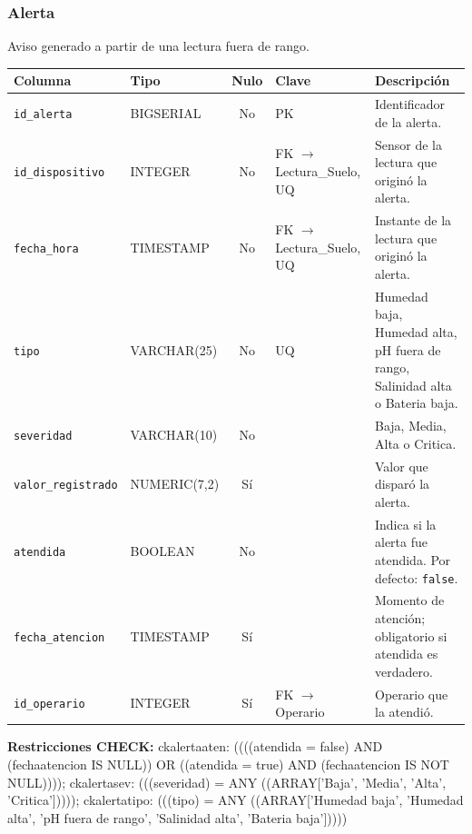 \documentclass[11pt,letterpaper]{article}
\newcommand{\tbus}{\textunderscore\allowbreak}
\newcommand{\tb}[1]{{\ttfamily\let\_\tbus #1}}
\begin{document}
\subsubsection*{Alerta}
Aviso generado a partir de una lectura fuera de rango.
{\footnotesize
\begin{longtable}{>{\raggedright\arraybackslash}p{3.3cm}>{\raggedright\arraybackslash}p{2.5cm}c>{\raggedright\arraybackslash}p{2.2cm}>{\raggedright\arraybackslash}p{6.1cm}}
\toprule
\textbf{Columna} & \textbf{Tipo} & \textbf{Nulo} & \textbf{Clave} & \textbf{Descripción} \\
\midrule
\endhead
\texttt{id\_alerta} & BIGSERIAL & No & PK & Identificador de la alerta. \\
\texttt{id\_dispositivo} & INTEGER & No & FK $\to$ Lectura\_Suelo, UQ & Sensor de la lectura que originó la alerta. \\
\texttt{fecha\_hora} & TIMESTAMP & No & FK $\to$ Lectura\_Suelo, UQ & Instante de la lectura que originó la alerta. \\
\texttt{tipo} & VARCHAR(25) & No & UQ & Humedad baja, Humedad alta, pH fuera de rango, Salinidad alta o Bateria baja. \\
\texttt{severidad} & VARCHAR(10) & No &  & Baja, Media, Alta o Critica. \\
\texttt{valor\_registrado} & NUMERIC(7,2) & Sí &  & Valor que disparó la alerta. \\
\texttt{atendida} & BOOLEAN & No &  & Indica si la alerta fue atendida. Por defecto: \texttt{false}. \\
\texttt{fecha\_atencion} & TIMESTAMP & Sí &  & Momento de atención; obligatorio si atendida es verdadero. \\
\texttt{id\_operario} & INTEGER & Sí & FK $\to$ Operario & Operario que la atendió. \\
\bottomrule
\end{longtable}}
{\footnotesize\textbf{Restricciones CHECK:} \tb{ck\_alerta\_aten}: \tb{((((atendida = false) AND (fecha\_atencion IS NULL)) OR ((atendida = true) AND (fecha\_atencion IS NOT NULL))))}; \tb{ck\_alerta\_sev}: \tb{(((severidad) = ANY ((ARRAY['Baja', 'Media', 'Alta', 'Critica']))))}; \tb{ck\_alerta\_tipo}: \tb{(((tipo) = ANY ((ARRAY['Humedad baja', 'Humedad alta', 'pH fuera de rango', 'Salinidad alta', 'Bateria baja']))))}\par}
\medskip
\end{document}
